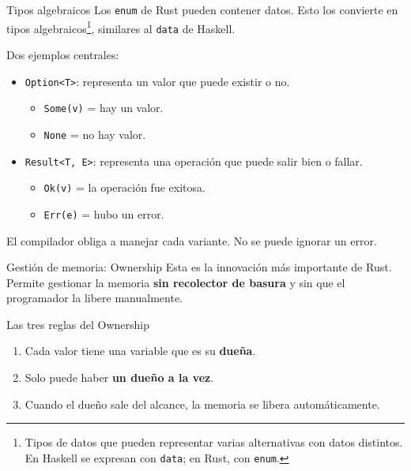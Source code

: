 \documentclass[11pt, aspectratio=169]{beamer}
\begin{document}
	\begin{frame}{Tipos algebraicos}
		Los \texttt{enum} de Rust pueden contener datos. Esto los convierte en tipos algebraicos\footnote{Tipos de datos que pueden representar varias alternativas con datos distintos. En Haskell se expresan con \texttt{data}; en Rust, con \texttt{enum}.}, similares al \texttt{data} de Haskell.
		
		\vspace{0.4cm}
		Dos ejemplos centrales:
		\begin{itemize}
			\item \texttt{Option<T>}: representa un valor que puede existir o no.
				\begin{itemize}
					\item \texttt{Some(v)} = hay un valor.
					\item \texttt{None} = no hay valor.
				\end{itemize}
			\item \texttt{Result<T, E>}: representa una operación que puede salir bien o fallar.
				\begin{itemize}
					\item \texttt{Ok(v)} = la operación fue exitosa.
					\item \texttt{Err(e)} = hubo un error.
				\end{itemize}
		\end{itemize}
		
		\vspace{0.2cm}
		El compilador obliga a manejar cada variante. No se puede ignorar un error.
	\end{frame}

	\begin{frame}{Gestión de memoria: Ownership}
		Esta es la innovación más importante de Rust. Permite gestionar la memoria \textbf{sin recolector de basura} y sin que el programador la libere manualmente.
		
		\vspace{0.4cm}
		
		\begin{block}{Las tres reglas del Ownership}
			\begin{enumerate}
				\item Cada valor tiene una variable que es su \textbf{dueña}.
				\item Solo puede haber \textbf{un dueño a la vez}.
				\item Cuando el dueño sale del alcance, la memoria se libera automáticamente.
			\end{enumerate}
		\end{block}
	\end{frame}
\end{document}
